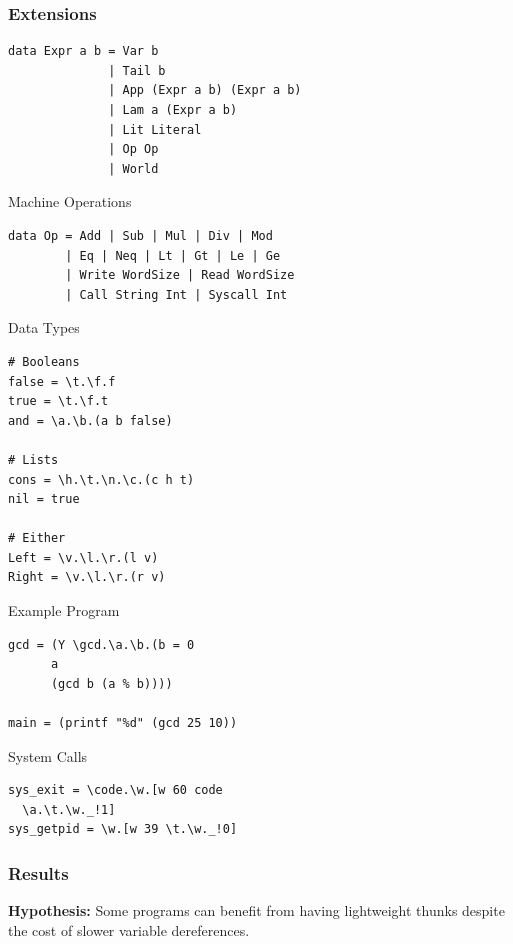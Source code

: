 \documentclass[14pt,mathserif]{beamer}
\begin{document}
\begin{frame}[fragile]
\frametitle{Extensions}
\small
\begin{lstlisting}
data Expr a b = Var b 
              | Tail b
              | App (Expr a b) (Expr a b) 
              | Lam a (Expr a b)
              | Lit Literal
              | Op Op
              | World
\end{lstlisting}
\end{frame}

\begin{frame}[fragile]{Machine Operations}
\small
\begin{lstlisting}
data Op = Add | Sub | Mul | Div | Mod 
        | Eq | Neq | Lt | Gt | Le | Ge 
        | Write WordSize | Read WordSize 
        | Call String Int | Syscall Int 
\end{lstlisting}
\end{frame}

\begin{frame}[fragile]{Data Types}
\small
\begin{lstlisting}
# Booleans
false = \t.\f.f
true = \t.\f.t
and = \a.\b.(a b false)

# Lists
cons = \h.\t.\n.\c.(c h t)
nil = true

# Either 
Left = \v.\l.\r.(l v)
Right = \v.\l.\r.(r v)
\end{lstlisting}
\end{frame}

\begin{frame}[fragile]{Example Program}
\small
\begin{lstlisting}
gcd = (Y \gcd.\a.\b.(b = 0 
      a 
      (gcd b (a % b))))

main = (printf "%d" (gcd 25 10))
\end{lstlisting}
\end{frame}

\begin{frame}[fragile]{System Calls}
\begin{lstlisting}
sys_exit = \code.\w.[w 60 code 
  \a.\t.\w._!1]
sys_getpid = \w.[w 39 \t.\w._!0]
\end{lstlisting}
\end{frame}

\begin{frame}[fragile]
\frametitle{Results}
\centering
\textbf{Hypothesis:} Some programs can benefit from having lightweight thunks
despite the cost of slower variable dereferences.
\end{frame}
\end{document}
